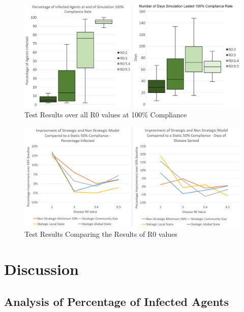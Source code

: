 \documentclass{article}
\begin{document}
\begin{figure}[h!]
\centering
\includegraphics[width=\textwidth]{6}
\caption{Test Results over all R0 values at 100\% Compliance}
\end{figure}

\begin{figure}[h!]
\centering
\includegraphics[width=\textwidth]{1}
\caption{Test Results Comparing the Results of R0 values}
\end{figure}
\newpage


\section{Discussion}

\subsection{Analysis of Percentage of Infected Agents}
\end{document}
